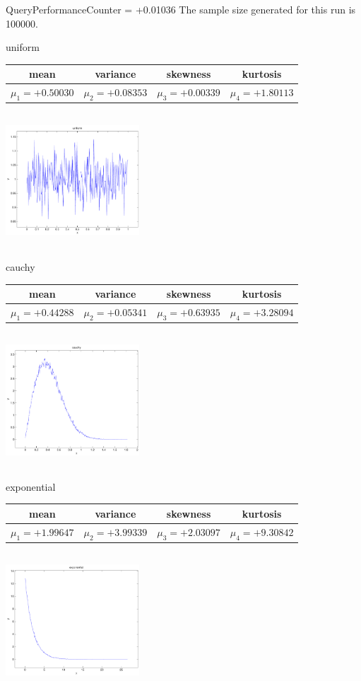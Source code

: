 \documentclass[9pt]{article}
\theoremstyle{plain}
\theoremstyle{definition}
\theoremstyle{remark}
\numberwithin{equation}{section}
\begin{document}
QueryPerformanceCounter  =  +0.01036
The sample size generated for this run is 100000.

\newpage
uniform \begin{tabular}{|c|c|c|c|}  mean & variance & skewness & kurtosis \\  \hline
$\mu_1 = +0.50030$ & $\mu_2 = +0.08353$ & $\mu_3 = +0.00339$ & $\mu_4 =+1.80113$ \\
\end{tabular}

\includegraphics[width=5cm,height=5cm]{uniform.pdf}

cauchy \begin{tabular}{|c|c|c|c|}  mean & variance & skewness & kurtosis \\  \hline
$\mu_1 = +0.44288$ & $\mu_2 = +0.05341$ & $\mu_3 = +0.63935$ & $\mu_4 =+3.28094$ \\
\end{tabular}

\includegraphics[width=5cm,height=5cm]{cauchy.pdf}

exponential \begin{tabular}{|c|c|c|c|}  mean & variance & skewness & kurtosis \\  \hline
$\mu_1 = +1.99647$ & $\mu_2 = +3.99339$ & $\mu_3 = +2.03097$ & $\mu_4 =+9.30842$ \\
\end{tabular}

\includegraphics[width=5cm,height=5cm]{exponential.pdf}
\end{document}
